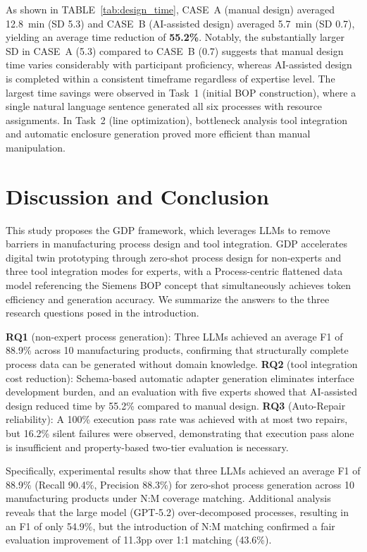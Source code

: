 \documentclass[conference]{IEEEtran}
\begin{document}
As shown in TABLE~\ref{tab:design_time}, CASE~A (manual design) averaged 12.8~min (SD 5.3) and CASE~B (AI-assisted design) averaged 5.7~min (SD 0.7), yielding an average time reduction of \textbf{55.2\%}. Notably, the substantially larger SD in CASE~A (5.3) compared to CASE~B (0.7) suggests that manual design time varies considerably with participant proficiency, whereas AI-assisted design is completed within a consistent timeframe regardless of expertise level. The largest time savings were observed in Task~1 (initial BOP construction), where a single natural language sentence generated all six processes with resource assignments. In Task~2 (line optimization), bottleneck analysis tool integration and automatic enclosure generation proved more efficient than manual manipulation.

\section{Discussion and Conclusion}

This study proposes the GDP framework, which leverages LLMs to remove barriers in manufacturing process design and tool integration. GDP accelerates digital twin prototyping through zero-shot process design for non-experts and three tool integration modes for experts, with a Process-centric flattened data model referencing the Siemens BOP concept that simultaneously achieves token efficiency and generation accuracy. We summarize the answers to the three research questions posed in the introduction.

\textbf{RQ1} (non-expert process generation): Three LLMs achieved an average F1 of 88.9\% across 10 manufacturing products, confirming that structurally complete process data can be generated without domain knowledge. \textbf{RQ2} (tool integration cost reduction): Schema-based automatic adapter generation eliminates interface development burden, and an evaluation with five experts showed that AI-assisted design reduced time by 55.2\% compared to manual design. \textbf{RQ3} (Auto-Repair reliability): A 100\% execution pass rate was achieved with at most two repairs, but 16.2\% silent failures were observed, demonstrating that execution pass alone is insufficient and property-based two-tier evaluation is necessary.

Specifically, experimental results show that three LLMs achieved an average F1 of 88.9\% (Recall 90.4\%, Precision 88.3\%) for zero-shot process generation across 10 manufacturing products under N:M coverage matching. Additional analysis reveals that the large model (GPT-5.2) over-decomposed processes, resulting in an F1 of only 54.9\%, but the introduction of N:M matching confirmed a fair evaluation improvement of 11.3pp over 1:1 matching (43.6\%).
\end{document}
